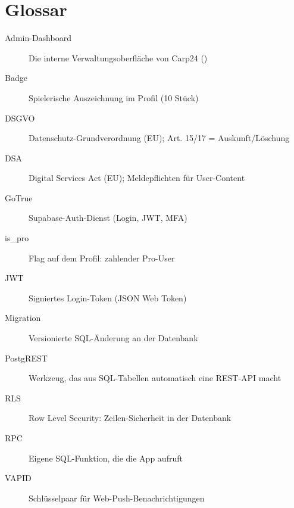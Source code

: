 \documentclass[11pt, a4paper]{article}
\newcommand{\code}[1]{\colorbox{codebg}{\texttt{\small\detokenize{#1}}}}
\begin{document}
\newpage
\section{Glossar}

\begin{description}
    \item[Admin-Dashboard] Die interne Verwaltungsoberfläche von Carp24 (\code{/admin/})
    \item[Badge] Spielerische Auszeichnung im Profil (10 Stück)
    \item[DSGVO] Datenschutz-Grundverordnung (EU); Art. 15/17 = Auskunft/Löschung
    \item[DSA] Digital Services Act (EU); Meldepflichten für User-Content
    \item[GoTrue] Supabase-Auth-Dienst (Login, JWT, MFA)
    \item[is\_pro] Flag auf dem Profil: zahlender Pro-User
    \item[JWT] Signiertes Login-Token (JSON Web Token)
    \item[Migration] Versionierte SQL-Änderung an der Datenbank
    \item[PostgREST] Werkzeug, das aus SQL-Tabellen automatisch eine REST-API macht
    \item[RLS] Row Level Security: Zeilen-Sicherheit in der Datenbank
    \item[RPC] Eigene SQL-Funktion, die die App aufruft
    \item[VAPID] Schlüsselpaar für Web-Push-Benachrichtigungen
\end{description}
\end{document}
